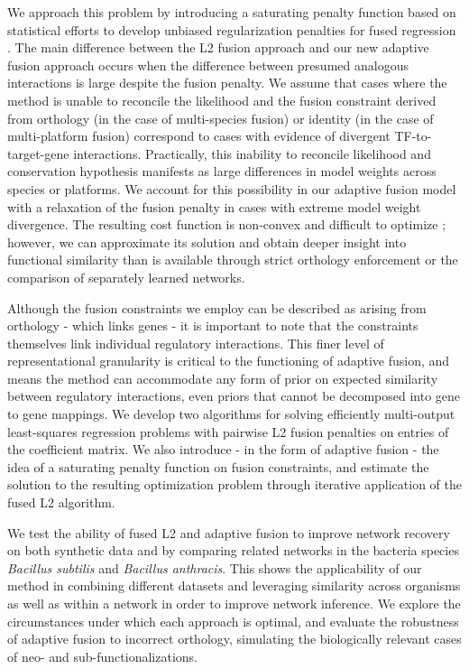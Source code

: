 \documentclass[11pt]{article}
\begin{document}
We approach this problem by introducing a saturating penalty function based on statistical efforts to develop unbiased regularization penalties for fused regression \cite{zhang2010nearly, fan2001variable}. 
The main difference between the L2 fusion approach and our new adaptive fusion approach occurs when the difference between presumed analogous interactions is large despite the fusion penalty. 
We assume that cases where the method is unable to reconcile the likelihood and the fusion constraint derived from orthology (in the case of multi-species fusion) or identity (in the case of multi-platform fusion) correspond to cases with evidence of divergent TF-to-target-gene interactions. 
Practically, this inability to reconcile likelihood and conservation hypothesis manifests as large differences in model weights across species or platforms. 
We account for this possibility in our adaptive fusion model with a relaxation of the fusion penalty in cases with extreme model weight divergence. 
The resulting cost function is non-convex and difficult to optimize \cite{fan2001variable}; however, we can approximate its solution and obtain deeper insight into functional similarity than is available through strict orthology enforcement or the comparison of separately learned networks. 

Although the fusion constraints we employ can be described as arising from orthology - which links genes - it is important to note that the constraints themselves link individual regulatory interactions. 
This finer level of representational granularity is critical to the functioning of adaptive fusion, and means the method can accommodate any form of prior on expected similarity between regulatory interactions, even priors that cannot be decomposed into gene to gene mappings. 
We develop two algorithms for solving efficiently multi-output least-squares regression problems with pairwise L2 fusion penalties on entries of the coefficient matrix. 
We also introduce - in the form of adaptive fusion - the idea of a saturating penalty function on fusion constraints, and estimate the solution to the resulting optimization problem through iterative application of the fused L2 algorithm.

We test the ability of fused L2 and adaptive fusion to improve network recovery on both synthetic data and by comparing related networks in the bacteria species \textit{Bacillus subtilis} and \textit{Bacillus anthracis}. 
This shows the applicability of our method in combining different datasets and leveraging similarity across organisms as well as within a network in order to improve network inference. We explore the circumstances under which each approach is optimal, and evaluate the robustness of adaptive fusion to incorrect orthology, simulating the biologically relevant cases of neo- and sub-functionalizations. 
\end{document}
